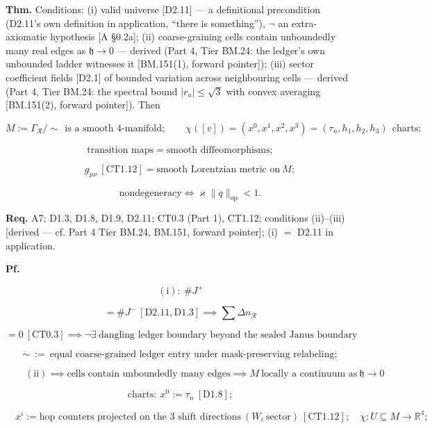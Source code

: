 \begin{theorem}\label{tag:CT2-6}
\textbf{Thm.} Conditions: (i) valid universe [D2.11] — a definitional precondition (D2.11’s own definition in application, “there is something”), $\neg$ an extra-axiomatic hypothesis [A §0.2a]; (ii) coarse-graining cells contain unboundedly many real edges as $\mathfrak h\to0$ — derived (Part 4, Tier BM.24: the ledger's own unbounded ladder witnesses it [BM.151(1), forward pointer]); (iii) sector coefficient fields [D2.1] of bounded variation across neighbouring cells — derived (Part 4, Tier BM.24: the spectral bound $|r_a|\le\sqrt3$ with convex averaging [BM.151(2), forward pointer]). Then

\[
M:=\Gamma_{\mathcal R}/\!\!\sim\ \ \text{is a smooth 4-manifold};\qquad
\chi([v])=(x^0,x^1,x^2,x^3)=(\tau_n,h_1,h_2,h_3)\ \ \text{charts};
\]

\[
\text{transition maps}=\text{smooth diffeomorphisms};
\]

\[
\qquad g_{\mu\nu}\ [\mathrm{CT1.12}]=\text{smooth Lorentzian metric on}\ M;
\]

\[
\qquad \text{nondegeneracy}\iff\varkappa\|q\|_{\mathrm{op}}<1 .
\]

\textbf{Req.} A7; D1.3, D1.8, D1.9, D2.11; CT0.3 (Part 1), CT1.12; conditions (ii)–(iii) [derived — cf. Part 4 Tier BM.24, BM.151, forward pointer]; (i) $=$ D2.11 in application.

\textbf{Pf.}

\[
(\mathrm{i}):\ \#J^+
\]

\[
= \#J^-\ [\mathrm{D2.11},\mathrm{D1.3}]\implies\textstyle\sum\Delta n_{\mathcal R}
\]

\[
= 0\ [\mathrm{CT0.3}]\implies\neg\exists\ \text{dangling ledger boundary beyond the sealed Janus boundary}
\]

\[
\sim\ :=\ \text{equal coarse-grained ledger entry under mask-preserving relabeling};
\]

\[
\qquad (\mathrm{ii})\implies\text{cells contain unboundedly many edges}\implies M\ \text{locally a continuum as}\ \mathfrak h\to0
\]

\[
\text{charts}:\ x^0:=\tau_n\ [\mathrm{D1.8}];
\]

\[
\quad x^i:=\text{hop counters projected on the 3 shift directions}\ (W_i\ \text{sector})\ [\mathrm{CT1.12}];\quad\chi:U\subseteq M\to\mathbb R^4;
\]


\end{theorem}
